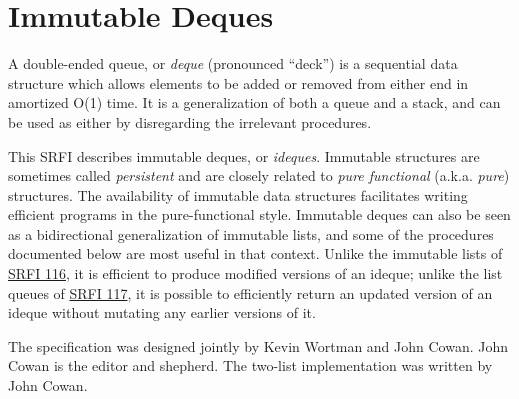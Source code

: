\section{Immutable Deques}\label{rationale}

A double-ended queue, or \emph{deque} (pronounced ``deck'') is a
sequential data structure which allows elements to be added or removed
from either end in amortized O(1) time. It is a generalization of both a
queue and a stack, and can be used as either by disregarding the
irrelevant procedures.

This SRFI describes immutable deques, or \emph{ideques}. Immutable
structures are sometimes called \emph{persistent} and are closely
related to \emph{pure functional} (a.k.a. \emph{pure}) structures. The
availability of immutable data structures facilitates writing efficient
programs in the pure-functional style. Immutable deques can also be seen
as a bidirectional generalization of immutable lists, and some of the
procedures documented below are most useful in that context. Unlike the
immutable lists of
\href{http://srfi.schemers.org/srfi-116/srfi-116.html}{SRFI 116}, it is
efficient to produce modified versions of an ideque; unlike the list
queues of \href{http://srfi.schemers.org/srfi-117/srfi-117.html}{SRFI
117}, it is possible to efficiently return an updated version of an
ideque without mutating any earlier versions of it.

The specification was designed jointly by Kevin Wortman and John Cowan.
John Cowan is the editor and shepherd. The two-list implementation was
written by John Cowan.
